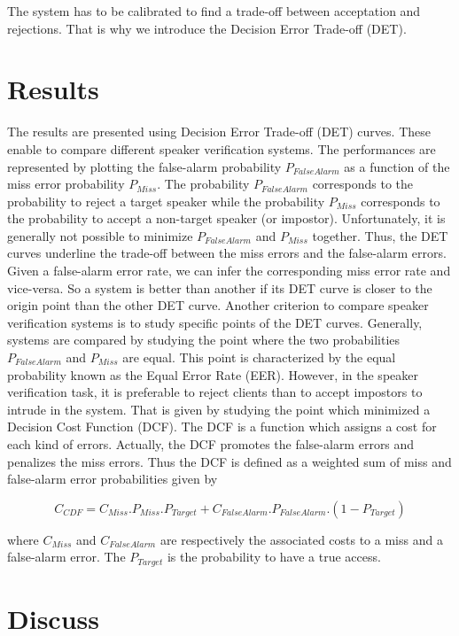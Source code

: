 \documentclass{techrep}
\begin{document}
The system has to be calibrated to find a trade-off between acceptation
and rejections. That is why we introduce the Decision Error Trade-off
(DET).

\section{Results}

The results are presented using Decision Error Trade-off (DET)
curves. These enable to compare different speaker verification
systems. The performances are represented by plotting the false-alarm
probability $P_{FalseAlarm}$ as a function of the miss error
probability $P_{Miss}$. The probability $P_{FalseAlarm}$ corresponds
to the probability to reject a target speaker while the probability
$P_{Miss}$ corresponds to the probability to accept a non-target
speaker (or impostor). Unfortunately, it is generally not possible to
minimize $P_{FalseAlarm}$ and $P_{Miss}$ together. Thus, the DET
curves underline the trade-off between the miss errors and the
false-alarm errors. Given a false-alarm error rate, we can infer the
corresponding miss error rate and vice-versa. So a system is better
than another if its DET curve is closer to the origin point than the
other DET curve.  Another criterion to compare speaker verification
systems is to study specific points of the DET curves. Generally,
systems are compared by studying the point where the two probabilities
$P_{FalseAlarm}$ and $P_{Miss}$ are equal. This point is characterized
by the equal probability known as the Equal Error Rate (EER). However,
in the speaker verification task, it is preferable to reject
clients than to accept impostors to intrude in the system. That is
given by studying the point which minimized a Decision Cost Function
(DCF). The DCF is a function which assigns a cost for each kind of
errors. Actually, the DCF promotes the false-alarm errors and
penalizes the miss errors. Thus the DCF is defined as a weighted sum
of miss and false-alarm error probabilities given by

$$C_{CDF} = C_{Miss}.P_{Miss}.P_{Target} + C_{FalseAlarm}.P_{FalseAlarm}.(1 - P_{Target})$$

where $C_{Miss}$ and $C_{FalseAlarm}$ are respectively the associated
costs to a miss and a false-alarm error. The $P_{Target}$ is the
probability to have a true access.

\section{Discuss}
\end{document}
